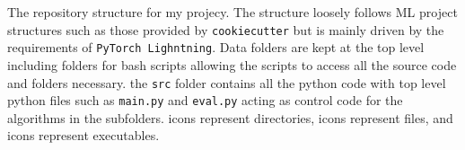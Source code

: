 The repository structure for my projecy.
The structure loosely follows ML project structures such as those provided by \texttt{cookiecutter} but is mainly driven by the requirements of \texttt{PyTorch Lighntning}.
Data folders are kept at the top level including folders for bash scripts allowing the scripts to access all the source code and folders necessary.
the \texttt{src} folder contains all the python code with top level python files such as \texttt{main.py} and \texttt{eval.py} acting as control code for the algorithms in the subfolders.
 icons represent directories,  icons represent files, and  icons represent executables.
